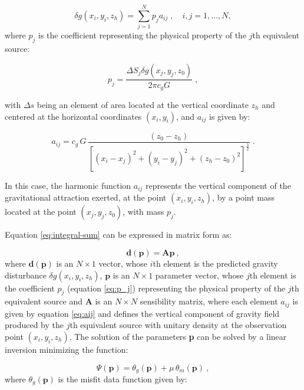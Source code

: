 \documentclass[paper]{geophysics}
\begin{document}
\begin{equation}
\delta g(x_{i}, y_{i}, z_{h}) = \sum_{j=1}^{N} p_j a_{ij} \; ,  \quad i,j = 1,\dots,N,
\label{eq:integral-sum}
\end{equation}
where $p_j$ is the coefficient representing the physical property of the $j$th equivalent source:

\begin{equation}
p_j = \frac{\Delta S_j \delta g(x_{j}, y_{j}, z_{0})}{2 \pi c_g G} \; ,
\label{eq:p_j}
\end{equation}

\noindent with $\Delta s$ being an element of area located at the vertical coordinate $z_h$ and centered at the horizontal coordinates $(x_i,y_i)$, and $a_{ij}$ is given by:

\begin{equation}
a_{ij}= c_{g} \, G \, \frac{(z_{0} - z_{h})}{\left[(x_{i} - x_{j})^{2} +	(y_{i} - y_{j})^{2} +	(z_{h} - z_{0})^{2} \right]^{\frac{3}{2}}} \; .
\label{eq:aij}
\end{equation}

In this case, the harmonic function $a_{ij}$ represents the vertical component of the gravitational attraction exerted, at the point $(x_{i}, y_{i}, z_{h})$, by a point mass located at the point $(x_{j}, y_{j}, z_{0})$, with mass $p_{j}$.

Equation \ref{eq:integral-sum} can be expressed in matrix form as:

\begin{equation}
\mathbf{d}(\mathbf{p}) = \mathbf{A} \mathbf{p} \: ,
\label{eq:predicted-data-vector}
\end{equation}
where $\mathbf{d}(\mathbf{p})$ is an $N \times 1$ vector, whose $i$th element is the predicted gravity disturbance $\delta g(x_{i}, y_{i}, z_{h})$, $\mathbf{p}$ is an $N \times 1$ parameter vector,  whose $j$th element is the coefficient $p_{j}$ (equation \ref{eq:p_j}) representing the physical property of the $j$th equivalent source and $\mathbf{A}$ is  an $N \times N$ sensibility matrix, where each element $a_{ij}$ is given by equation \ref{eq:aij} and defines the vertical component of gravity field produced by  the $j$th equivalent source with unitary density at the observation point $(x_{i}, y_{i}, z_{h})$.
The solution of the parameters \textbf{p} can be solved by a linear inversion minimizing the function:

\begin{equation}
\Psi(\mathbf{p}) = \theta_g(\mathbf{p}) + \mu \, \theta_m(\mathbf{p}) \: ,
\label{eq:goal-function}
\end{equation}
where $\theta_g(\mathbf{p})$ is the misfit data function given by:
\end{document}
